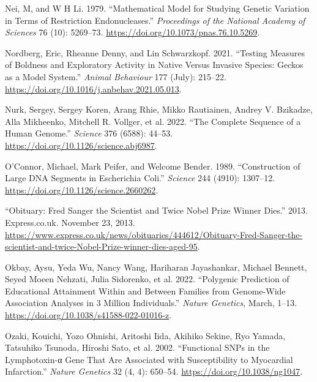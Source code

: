 \documentclass[
]{book}
\newlength{\cslhangindent}
\newlength{\cslentryspacingunit} %
\newenvironment{CSLReferences}[2] %
 {%
  \setlength{\parindent}{0pt}
  \ifodd #1
  \let\oldpar\par
  \def\par{\hangindent=\cslhangindent\oldpar}
  \fi
  \setlength{\parskip}{#2\cslentryspacingunit}
 }%
 {}
\begin{document}
\begin{CSLReferences}{1}{0}
\leavevmode{}%
Nei, M, and W H Li. 1979. {``Mathematical Model for Studying Genetic Variation in Terms of Restriction Endonucleases.''} \emph{Proceedings of the National Academy of Sciences} 76 (10): 5269--73. \url{https://doi.org/10.1073/pnas.76.10.5269}.

\leavevmode{}%
Nordberg, Eric, Rheanne Denny, and Lin Schwarzkopf. 2021. {``Testing Measures of Boldness and Exploratory Activity in Native Versus Invasive Species: Geckos as a Model System.''} \emph{Animal Behaviour} 177 (July): 215--22. \url{https://doi.org/10.1016/j.anbehav.2021.05.013}.

\leavevmode{}%
Nurk, Sergey, Sergey Koren, Arang Rhie, Mikko Rautiainen, Andrey V. Bzikadze, Alla Mikheenko, Mitchell R. Vollger, et al. 2022. {``The Complete Sequence of a Human Genome.''} \emph{Science} 376 (6588): 44--53. \url{https://doi.org/10.1126/science.abj6987}.

\leavevmode{}%
O'Connor, Michael, Mark Peifer, and Welcome Bender. 1989. {``Construction of {Large DNA Segments} in {Escherichia} Coli.''} \emph{Science} 244 (4910): 1307--12. \url{https://doi.org/10.1126/science.2660262}.

\leavevmode{}%
{``Obituary: {Fred Sanger} the Scientist and Twice {Nobel Prize} Winner Dies.''} 2013. {Express.co.uk}. November 23, 2013. \url{https://www.express.co.uk/news/obituaries/444612/Obituary-Fred-Sanger-the-scientist-and-twice-Nobel-Prize-winner-dies-aged-95}.

\leavevmode{}%
Okbay, Aysu, Yeda Wu, Nancy Wang, Hariharan Jayashankar, Michael Bennett, Seyed Moeen Nehzati, Julia Sidorenko, et al. 2022. {``Polygenic Prediction of Educational Attainment Within and Between Families from Genome-Wide Association Analyses in 3 Million Individuals.''} \emph{Nature Genetics}, March, 1--13. \url{https://doi.org/10.1038/s41588-022-01016-z}.

\leavevmode{}%
Ozaki, Kouichi, Yozo Ohnishi, Aritoshi Iida, Akihiko Sekine, Ryo Yamada, Tatsuhiko Tsunoda, Hiroshi Sato, et al. 2002. {``Functional {SNPs} in the Lymphotoxin-α Gene That Are Associated with Susceptibility to Myocardial Infarction.''} \emph{Nature Genetics} 32 (4, 4): 650--54. \url{https://doi.org/10.1038/ng1047}.


\end{CSLReferences}
\end{document}

